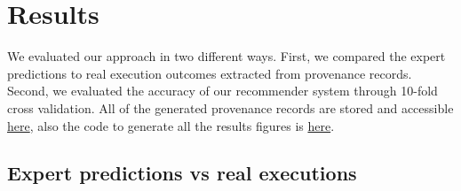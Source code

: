 




\section{Results}

We evaluated our approach in two different ways. First, 
we compared the expert predictions to 
real execution outcomes extracted from provenance records.
Second, we evaluated 
the accuracy of our recommender system through 10-fold cross validation. All of the generated provenance records are stored and accessible \href{https://github.com/mandana-mazaheri/conp-pipeline-examples/tree/a2c80c91c50776dfc831f89d294e3cb862a3d9a6}{here}, also the code to generate all the results figures is \href{https://github.com/mandana-mazaheri/Pipelines-datasets-recommender-paper/blob/master/scripts/scientificRecommender_v4.py}{here}.

\subsection{Expert predictions vs real executions}


